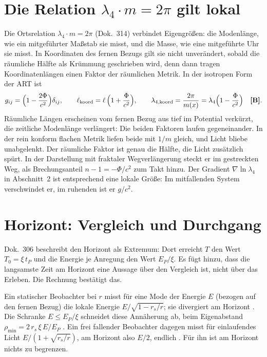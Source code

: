\section{Die Relation \texorpdfstring{$\lambda_4\cdot m=2\pi$}{lambda4 m = 2 pi} gilt lokal}

Die Ortsrelation $\lambda_4\cdot m=2\pi$ (Dok.~314) verbindet Eigengrößen: die Modenlänge, wie
ein mitgeführter Maßstab sie misst, und die Masse, wie eine mitgeführte Uhr sie misst. In
Koordinaten des fernen Bezugs gilt sie nicht unverändert, sobald die räumliche Hälfte als
Krümmung geschrieben wird, denn dann tragen Koordinatenlängen einen Faktor der räumlichen Metrik.
In der isotropen Form der ART ist
\begin{equation}
g_{ij}=\Bigl(1-\frac{2\Phi}{c^2}\Bigr)\delta_{ij},\qquad
\ell_{\text{koord}}=\ell\,\Bigl(1+\frac{\Phi}{c^2}\Bigr),\qquad
\lambda_{4,\text{koord}}=\frac{2\pi}{m(x)}=\lambda_4\Bigl(1-\frac{\Phi}{c^2}\Bigr)\quad\textbf{[B]}.
\end{equation}
Räumliche Längen erscheinen vom fernen Bezug aus tief im Potential verkürzt, die zeitliche
Modenlänge verlängert: Die beiden Faktoren laufen gegeneinander. In der rein konform flachen
Metrik liefen beide mit $1/m$ gleich, und Licht bliebe unabgelenkt. Der räumliche Faktor ist genau
die Hälfte, die Licht zusätzlich spürt. In der Darstellung mit fraktaler Wegverlängerung steckt
er im gestreckten Weg, als Brechungsanteil $n-1=-\Phi/c^2$ zum Takt hinzu. Der
Gradient $\nabla\ln\lambda_4$ in Abschnitt~2 ist entsprechend eine lokale Größe: Im mitfallenden
System verschwindet er, im ruhenden ist er $g/c^2$.

\section{Horizont: Vergleich und Durchgang}

Dok.~306 beschreibt den Horizont als Extremum: Dort erreicht $T$ den Wert $T_0=\xi\,t_P$ und die
Energie je Anregung den Wert $E_P/\xi$. Es fügt hinzu, dass die \glqq langsamste Zeit\grqq{} am
Horizont eine Aussage über den Vergleich ist, nicht über das Erleben. Die Rechnung bestätigt das.

Ein statischer Beobachter bei $r$ misst für eine Mode der Energie $E$ (bezogen auf den fernen
Bezug) die lokale Energie $E/\sqrt{1-r_s/r}$; sie divergiert am Horizont \BM. Die Schranke
$E\le E_P/\xi$ schneidet diese Annäherung ab, beim Eigenabstand
$\rho_{\min}=2\,r_s\,\xi\,E/E_P$ \BM. Ein frei fallender Beobachter dagegen misst für einlaufendes
Licht $E/(1+\sqrt{r_s/r})$, am Horizont also $E/2$, endlich \BM. Für ihn ist am Horizont nichts
zu begrenzen.

